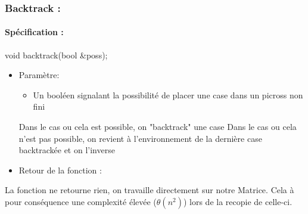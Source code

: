 \documentclass{article}
\begin{document}
\subsubsection{Backtrack :}
\paragraph{Spécification :}
 void backtrack(bool \&poss);
\begin{itemize}
\item Param\`etre:
\begin{itemize}
\item Un booléen signalant la possibilité de placer une case dans un picross non fini
\end{itemize}
Dans le cas ou cela est possible, on "backtrack" une case
Dans le cas ou cela n'est pas possible, on revient à l'environnement de la dernière case backtrackée et on l'inverse
\item Retour de la fonction :
\end{itemize}
La fonction ne retourne rien, on travaille directement sur notre Matrice.\newline
Cela à pour conséquence une complexité élevée ($\theta(n^2)$) lors de la recopie de celle-ci.
\end{document}

